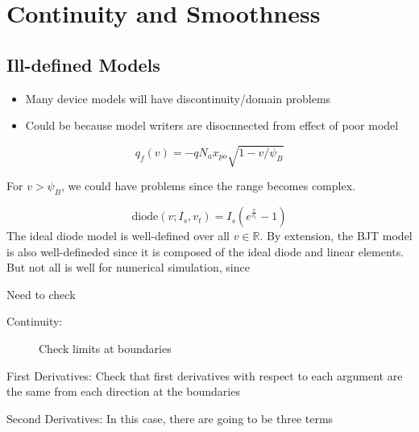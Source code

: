 \documentclass{report}
\begin{document}
\chapter{Continuity and Smoothness}

\section{Ill-defined Models}
\begin{itemize}
    \item Many device models will have discontinuity/domain problems
    \item Could be because model writers are disocnnected from effect of poor model
\end{itemize}

\begin{example}
    \begin{equation*}
        q_f(v) = -q N_a x_{po}\sqrt{1 - v/\psi_B}
    \end{equation*}
\end{example}
For $v > \psi_B$, we could have problems since the range becomes complex.

\begin{example}
    \begin{equation*}
        \mathrm{diode}(v; I_s, v_t) = I_s(e^{\frac{v}{v_t}} - 1)
    \end{equation*}
    The ideal diode model is well-defined over all $v \in \mathbb{R}$. By extension, the BJT model is also well-defineded since it is composed of the ideal diode and linear elements. But not all is well for numerical simulation, since 
\end{example}

\begin{example}

    Need to check
    \begin{description}
        \item[Continuity: ] 
        Check limits at boundaries
    \end{description}
        \item[First Derivatives: ] Check that first derivatives with respect to each argument are the same from each direction at the boundaries
        \item[Second Derivatives: ]
        In this case, there are going to be three terms
\end{example}
\end{document}
